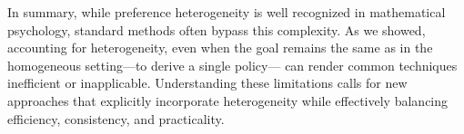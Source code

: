 In summary, while preference heterogeneity is well recognized in mathematical psychology, standard methods often bypass this complexity. As we showed, accounting for heterogeneity\ifarxiv, even when the goal remains the same as in the homogeneous setting---to derive a single policy---\fi
can render common techniques inefficient or inapplicable. Understanding these limitations calls for new approaches that explicitly incorporate heterogeneity while effectively balancing efficiency, consistency, and practicality.




